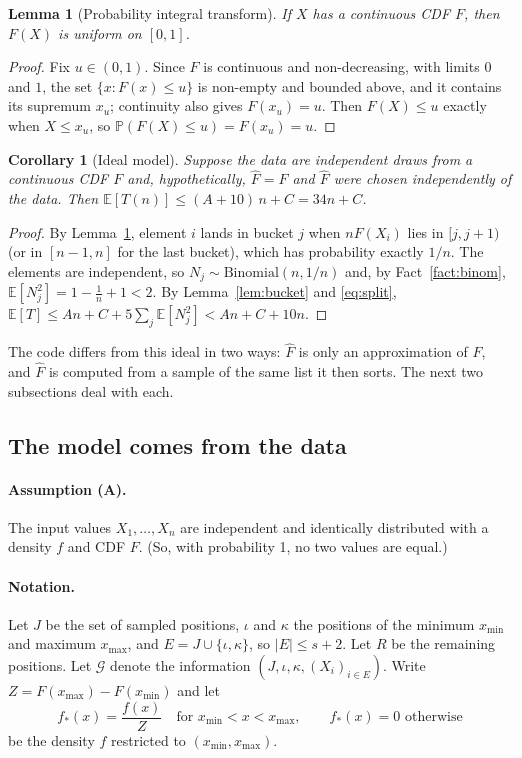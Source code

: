 \documentclass[11pt]{article}
\newtheorem{lemma}[theorem]{Lemma}
\newtheorem{corollary}[theorem]{Corollary}
\theoremstyle{definition}
\theoremstyle{remark}
\newcommand{\Fh}{\widehat{F}}
\newcommand{\E}{\mathbb{E}}
\newcommand{\Prob}{\mathbb{P}}
\newcommand{\xmin}{x_{\min}}
\newcommand{\xmax}{x_{\max}}
\newcommand{\G}{\mathcal{G}}
\begin{document}
\begin{lemma}[Probability integral transform]\label{lem:pit}
If $X$ has a continuous CDF $F$, then $F(X)$ is uniform on $[0,1]$.
\end{lemma}
\begin{proof}
Fix $u\in(0,1)$. Since $F$ is continuous and non-decreasing, with limits $0$
and $1$, the set $\{x:F(x)\le u\}$ is non-empty and bounded above, and it
contains its supremum $x_u$; continuity also gives $F(x_u)=u$. Then
$F(X)\le u$ exactly when $X\le x_u$, so
$\Prob(F(X)\le u)=F(x_u)=u$.
\end{proof}

\begin{corollary}[Ideal model]\label{cor:ideal}
Suppose the data are independent draws from a continuous CDF $F$ and,
hypothetically, $\Fh=F$ and $\Fh$ were chosen independently of the data.
Then $\E[T(n)]\le(A+10)\,n+C=34n+C$.
\end{corollary}
\begin{proof}
By Lemma~\ref{lem:pit}, element $i$ lands in bucket $j$ when $nF(X_i)$ lies in
$[j,j+1)$ (or in $[n-1,n]$ for the last bucket), which has probability
exactly $1/n$. The elements are independent, so
$N_j\sim\mathrm{Binomial}(n,1/n)$ and, by Fact~\ref{fact:binom},
$\E[N_j^2]=1-\tfrac1n+1<2$. By Lemma~\ref{lem:bucket} and
\eqref{eq:split},
$\E[T]\le An+C+5\sum_j\E[N_j^2]<An+C+10n$.
\end{proof}

The code differs from this ideal in two ways: $\Fh$ is only an
approximation of $F$, and $\Fh$ is computed from a sample of the same list
it then sorts. The next two subsections deal with each.

\subsection{The model comes from the data}

\paragraph{Assumption (A).} The input values $X_1,\dots,X_n$ are independent
and identically distributed with a density $f$ and CDF $F$. (So, with
probability 1, no two values are equal.)

\paragraph{Notation.} Let $J$ be the set of sampled positions, $\iota$ and
$\kappa$ the positions of the minimum $\xmin$ and maximum $\xmax$, and
$E=J\cup\{\iota,\kappa\}$, so $|E|\le s+2$. Let $R$ be the remaining
positions. Let $\G$ denote the information $(J,\iota,\kappa,(X_i)_{i\in E})$.
Write $Z=F(\xmax)-F(\xmin)$ and let
\[
f_\ast(x)=\frac{f(x)}{Z}\quad\text{for }\xmin<x<\xmax,\qquad f_\ast(x)=0\text{ otherwise}
\]
be the density $f$ restricted to $(\xmin,\xmax)$.
\end{document}
